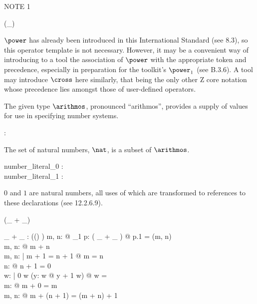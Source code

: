 NOTE 1
\begin{zed}
\generic (\power \_)
\end{zed}
$\power$ has already been introduced in this International Standard
(see 8.3),
so this operator template is not necessary.
However, it may be a convenient way of introducing to a tool
the association of $\power$ with the appropriate token and precedence,
especially in preparation for the toolkit's $\power_1$ (see B.3.6).
A tool may introduce $\cross$ here similarly,
that being the only other Z core notation whose precedence
lies amongst those of user-defined operators.


\begin{zed}
[\arithmos]
\end{zed}

The given type $\arithmos$, pronounced ``arithmos'', provides
a supply of values for use in specifying number systems.

\begin{axdef}
\nat : \power \arithmos
\end{axdef}

The set of natural numbers, $\nat$, is a subset of $\arithmos$.


\begin{axdef}
  number\_literal\_0 : \nat\\
  number\_literal\_1 : \nat
\end{axdef}

$0$ and $1$ are natural numbers, all uses of which are transformed
to references to these declarations (see 12.2.6.9).

\begin{zed}
 \leftassoc (\_ + \_)
\end{zed}

\begin{axdef}
\_ + \_ : \power ((\arithmos \cross \arithmos) \cross \arithmos)
\where
\forall m, n: \nat @ \exists_1 p: ( \_ + \_ ) @ p.1 = (m, n)\\
\forall m, n: \nat @ m + n \in \nat\\
\forall m, n: \nat | m + 1 = n + 1 @ m = n\\
\forall n: \nat @ \lnot n + 1 = 0\\
\forall w: \power \nat | 0 \in w \land (\forall y: w @ y + 1 \in w) @ w = \nat\\
\forall m: \nat @ m + 0 = m\\
\forall m, n: \nat @ m + (n + 1) = (m + n) + 1
\end{axdef}




